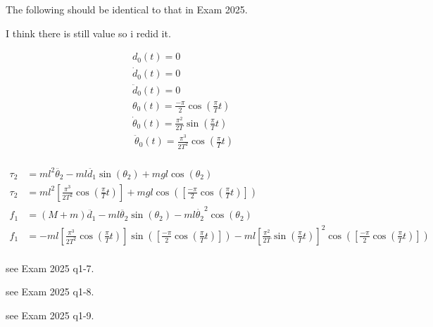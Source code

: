 \begin{solutionbox}[Q1-6]
    The following should be identical to that in Exam 2025.

    I think there is still value so i redid it.

    \begin{align*}
        d_0(t)=0                                                  \\
        \dot{d}_0(t)=0                                            \\
        \ddot{d}_0(t)=0                                           \\
        \theta_0(t)=\frac{-\pi}{2}\cos(\frac{\pi}{T}t)            \\
        \dot{\theta}_0(t)=\frac{\pi^2}{2T}\sin(\frac{\pi}{T}t)    \\\
        \ddot{\theta}_0(t)=\frac{\pi^3}{2T^2}\cos(\frac{\pi}{T}t) \\\
    \end{align*}

    \begin{align*}
        \tau_2 & = ml^2\ddot{\theta_2}-ml\ddot{d_1}\sin(\theta_2) + mgl\cos(\theta_2)                                                 \\
        \tau_2 & = ml^2\left[\frac{\pi^3}{2T^2}\cos(\frac{\pi}{T}t)\right] + mgl\cos(\left[\frac{-\pi}{2}\cos(\frac{\pi}{T}t)\right]) \\
        f_1    & = (M+m)\ddot{d_1} -ml\ddot{\theta_2}\sin(\theta_2)-ml\dot{\theta_2}^2\cos(\theta_2)                                  \\
        f_1    & =
        -ml\left[\frac{\pi^3}{2T^2}\cos(\frac{\pi}{T}t)\right]
        \sin(\left[\frac{-\pi}{2}\cos(\frac{\pi}{T}t)\right])
        -ml\left[\frac{\pi^2}{2T}\sin(\frac{\pi}{T}t)\right]^2
        \cos(\left[\frac{-\pi}{2}\cos(\frac{\pi}{T}t)\right])                                                                         \\
    \end{align*}
\end{solutionbox}

\begin{solutionbox}[Q1-7]
    see Exam 2025 q1-7.
\end{solutionbox}

\begin{solutionbox}[Q1-8]
    see Exam 2025 q1-8.
\end{solutionbox}

\begin{solutionbox}[Q1-9]
    see Exam 2025 q1-9.
\end{solutionbox}